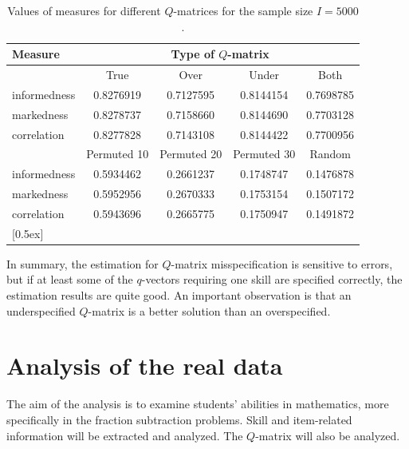\documentclass[english]{pwr_wmat_praca_dyplomowa}
\theoremstyle{plain}
\numberwithin{theorem}{chapter}
\theoremstyle{definition}
\numberwithin{theorem}{chapter}
\begin{document}
	\begin{table}
		\centering
		\begin{tabular}{l c c c c} 
			\hline
			{\rule{0pt}{3ex}}Measure & \multicolumn{4}{c}{Type of $Q$-matrix} \\ [0.5ex]
			\hline
			{\rule{0pt}{3ex}}&True & Over & Under & Both \\\cmidrule{2-5}
			informedness & 0.8276919 & 0.7127595 & 0.8144154 & 0.7698785 \\ 
			markedness & 0.8278737 & 0.7158660 & 0.8144690 & 0.7703128 \\ 
			correlation & 0.8277828 & 0.7143108 & 0.8144422 & 0.7700956\\ 
			\hline
			{\rule{0pt}{3ex}}& Permuted 10 & Permuted 20 & Permuted 30 & Random \\\cmidrule{2-5}
			informedness & 0.5934462 & 0.2661237 & 0.1748747 & 0.1476878 \\ 
			markedness & 0.5952956 & 0.2670333 & 0.1753154 & 0.1507172 \\ 
			correlation & 0.5943696 & 0.2665775 & 0.1750947 & 0.1491872\\ 
			[0.5ex] 
			\hline 
		\end{tabular}
		\caption{Values of measures for different $Q$-matrices for the sample size $I=5000$.}
		\label{tab:confusion_matrix_values_qmat_5000} 
	\end{table}
	
	In summary, the estimation for $Q$-matrix misspecification is sensitive to errors, but if at least some of the $q$-vectors requiring one skill are specified correctly, the estimation results are quite good. An important observation is that an underspecified $Q$-matrix is a better solution than an overspecified.
	
	
	\chapter{Analysis of the real data}\label{chapter:real_data}
	
	The aim of the analysis is to examine students' abilities in mathematics, more specifically in the fraction subtraction problems. Skill and item-related information will be extracted and analyzed. The $Q$-matrix will also be analyzed. 
	
\end{document}
